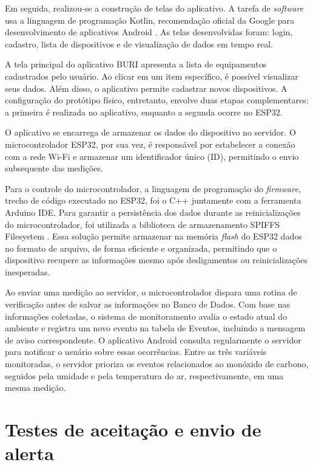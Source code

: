 \documentclass[alpha-refs,brazilian]{RBCA_v3.0}
\begin{document}
Em seguida, realizou-se a construção de telas do aplicativo. A tarefa de \textit{software} usa a linguagem de programação Kotlin, recomendação 
oficial da Google para desenvolvimento de aplicativos Android \citep{google-developers}. As telas desenvolvidas foram: login, cadastro, lista de dispositivos e de 
visualização de dados em tempo real.

A tela principal do aplicativo BURI apresenta a lista de equipamentos cadastrados pelo usuário. Ao clicar em um item específico, é possível visualizar seus dados. Além disso, o 
aplicativo permite cadastrar novos dispositivos. A configuração do protótipo físico, entretanto, envolve duas etapas complementares: a primeira é realizada no aplicativo, enquanto 
a segunda ocorre no ESP32.

O aplicativo se encarrega de armazenar os dados do dispositivo no servidor. O microcontrolador ESP32, por sua vez, é responsável por estabelecer a conexão com a rede Wi-Fi e armazenar 
um identificador único (ID), permitindo o envio subsequente das medições.

Para o controle do microcontrolador, a linguagem de programação do \textit{firmware}, trecho de código 
executado no ESP32, foi o C++ juntamente com a ferramenta Arduino IDE. Para garantir a persistência dos dados 
durante as reinicializações do microcontrolador, foi utilizada a biblioteca de armazenamento SPIFFS Filesystem \citep{spiffs}. Essa solução permite armazenar
na memória \textit{flash} do ESP32 dados no formato de arquivo, de forma eficiente e organizada, permitindo que o dispositivo 
recupere as informações mesmo após desligamentos ou reinicializações inesperadas.

Ao enviar uma medição ao servidor, o microcontrolador dispara uma rotina de verificação antes de salvar as informações no Banco de Dados. Com base nas 
informações coletadas, o sistema de monitoramento avalia o estado atual do ambiente e registra um novo evento na tabela de Eventos, incluindo a mensagem
de aviso correspondente. O aplicativo Android consulta regularmente o servidor para notificar o usuário sobre essas ocorrências. Entre as três variáveis 
monitoradas, o servidor prioriza os eventos relacionados ao monóxido de carbono, seguidos pela umidade e pela temperatura do ar, respectivamente, em uma mesma medição. 

\section{Testes de aceitação e envio de alerta}\label{sec05:testes}
\end{document}
